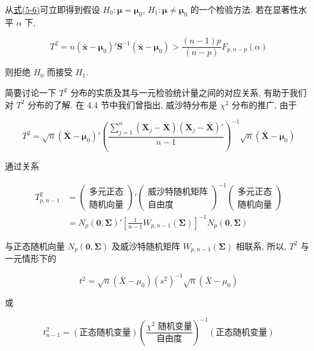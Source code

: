 从\hyperref[eq:5-6]{式(5-6)}可立即得到假设 $H_0: \boldsymbol{\mu}=\boldsymbol{\mu}_0$, $H_1: \boldsymbol{\mu}\neq\boldsymbol{\mu}_0$ 的一个检验方法. 若在显著性水平 $\alpha$ 下,

\label{eq:5-7}
\begin{equation}
T^2=n(\bar{\mathbf{x}}-\boldsymbol{\mu}_0)'\mathbf{S}^{-1}(\bar{\mathbf{x}}-\boldsymbol{\mu}_0)>\frac{(n-1)p}{(n-p)}F_{p,n-p}(\alpha) \tag{5-7}
\end{equation}

则拒绝 $H_0$ 而接受 $H_1$.

简要讨论一下 $T^2$ 分布的实质及其与一元检验统计量之间的对应关系, 有助于我们对 $T^2$ 分布的了解. 在 4.4 节中我们曾指出, 威沙特分布是 $\chi^2$ 分布的推广, 由于

\[
T^2=\sqrt{n}(\bar{\mathbf{X}}-\boldsymbol{\mu}_0)'\left(\frac{\sum_{j=1}^{n}(\mathbf{X}_j-\bar{\mathbf{X}})(\mathbf{X}_j-\bar{\mathbf{X}})'}{n-1}\right)^{-1}\sqrt{n}(\bar{\mathbf{X}}-\boldsymbol{\mu}_0)
\]

通过关系

\label{eq:5-8}
\begin{equation}
\begin{aligned}
T^2_{p,n-1}&=\begin{pmatrix}\text{多元正态}\\ \text{随机向量}\end{pmatrix}'\begin{pmatrix}\text{威沙特随机矩阵}\\ \text{自由度}\end{pmatrix}^{-1}\begin{pmatrix}\text{多元正态}\\ \text{随机向量}\end{pmatrix}\\
&=N_p(\mathbf{0},\boldsymbol{\Sigma})'\left[\frac{1}{n-1}W_{p,n-1}(\boldsymbol{\Sigma})\right]^{-1}N_p(\mathbf{0},\boldsymbol{\Sigma})
\end{aligned} \tag{5-8}
\end{equation}

与正态随机向量 $N_p(\mathbf{0},\boldsymbol{\Sigma})$ 及威沙特随机矩阵 $W_{p,n-1}(\boldsymbol{\Sigma})$ 相联系, 所以, $T^2$ 与一元情形下的

\[
t^2=\sqrt{n}(\bar{X}-\mu_0)(s^2)^{-1}\sqrt{n}(\bar{X}-\mu_0)
\]

或

\[
t^2_{n-1}=\left(\text{正态随机变量}\right)\left(\frac{\chi^2\text{ 随机变量}}{\text{自由度}}\right)^{-1}\left(\text{正态随机变量}\right)
\]

